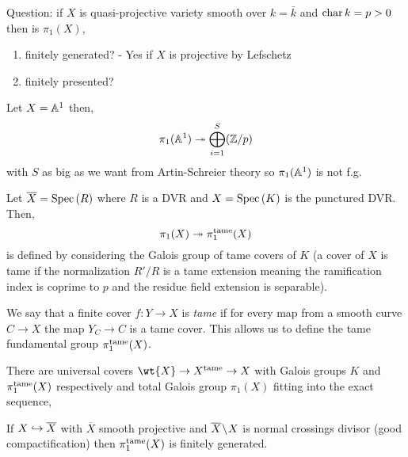 \documentclass[12pt]{article}
\begin{document}
\noindent
Question: if $X$ is quasi-projective variety smooth over $k = \bar{k}$ and $\operatorname{\mathrm{char}}{k} = p > 0$ then is $\pi_1(X)$,
\begin{enumerate}
\item finitely generated? - Yes if $X$ is projective by Lefschetz 
\item finitely presented? 
\end{enumerate}


\begin{example}
Let $X = \mathbb{A}^1$ then,
\[ \pi_1(\mathbb{A}^1) \twoheadrightarrow \bigoplus_{i = 1}^S (\mathbb{Z} / p) \]
with $S$ as big as we want from Artin-Schreier theory so $\pi_1(\mathbb{A}^1)$ is not f.g.
\end{example}

\begin{defn}
Let $\overline{X} = \mathrm{Spec}\left( R \right)$ where $R$ is a DVR and $X = \mathrm{Spec}\left( K \right)$ is the punctured DVR. Then,
\[ \pi_1(X) \twoheadrightarrow \pi_1^{\mathrm{tame}}(X) \]
is defined by considering the Galois group of tame covers of $K$ (a cover of $X$ is tame if the normalization $R' / R$ is a tame extension meaning the ramification index is coprime to $p$ and the residue field extension is separable). 
\end{defn}

\begin{defn}
We say that a finite \etale cover $f : Y \to X$ is \textit{tame} if for every map from a smooth curve $C \to X$ the map $Y_C \to C$ is a tame \etale cover. This allows us to define the tame fundamental group $\pi_1^{\mathrm{tame}}(X)$. 
\end{defn}

\begin{rmk}
There are universal covers $\wt{X} \to X^{\tame} \to X$ with Galois groups $K$ and $\pi_1^{\mathrm{tame}}(X)$ respectively and total Galois group $\pi_1(X)$ fitting into the exact sequence,
\begin{center}
\end{center}
\end{rmk}

\begin{lemma}
If $X \hookrightarrow \overline{X}$ with $\overline{X}$ smooth projective and $\overline{X} \! \setminus \! X$ is normal crossings divisor (good compactification) then $\pi_1^{\mathrm{tame}}(X)$ is finitely generated.
\end{lemma}
\end{document}
